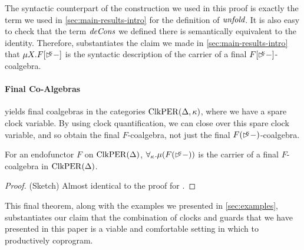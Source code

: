 The syntactic counterpart of the construction we used in this proof is
exactly the term we used in \autoref{sec:main-results-intro} for the
definition of $\textit{unfold}$. It is also easy to check that the term
$\textit{deCons}$ we defined there is semantically equivalent to the
identity. Therefore,  substantiates
the claim we made in \autoref{sec:main-results-intro} that $\mu
X. F[\mathord{\rhd\kern-0.4em^{\kappa}}-]$ is the syntactic description of the carrier of a
final $F[\mathord{\rhd\kern-0.4em^{\kappa}}-]$-coalgebra.

\paragraph{Final Co-Algebras}  yields
final coalgebras in the categories $\mathrm{ClkPER}(\Delta, \kappa)$, where we
have a spare clock variable. By using clock quantification, we can
close over this spare clock variable, and so obtain the final
$F$-coalgebra, not just the final $F(\mathord{\rhd\kern-0.4em^{\kappa}}-)$-coalgebra.

\begin{theorem}\label{thm:final-f-coalgebra}
  For an endofunctor $F$ on $\mathrm{ClkPER}(\Delta)$, $\forall_\kappa. \mu
  (F(\mathord{\rhd\kern-0.4em^{\kappa}}-))$ is the carrier of a final $F$-coalgebra in
  $\mathrm{ClkPER}(\Delta)$.
\end{theorem}

\begin{proof}
  (Sketch) Almost identical to the proof for
  .
\end{proof}

This final theorem, along with the examples we presented in
\autoref{sec:examples}, substantiates our claim that the combination
of clocks and guards that we have presented in this paper is a viable
and comfortable setting in which to productively coprogram.

